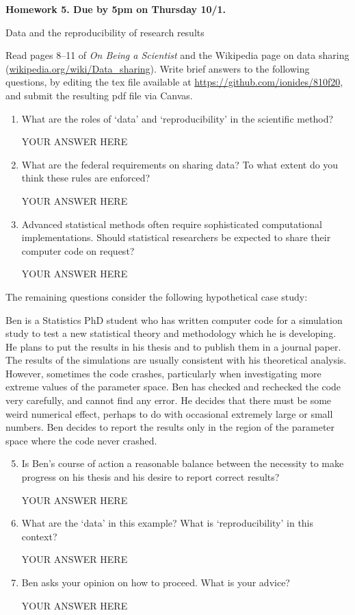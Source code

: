 \documentclass[12pt]{article}
\begin{document}
\begin{center}\bf
Homework 5. Due by 5pm on Thursday 10/1.

Data and the reproducibility of research results
\end{center}
Read pages 8--11 of {\em On Being a Scientist} and the Wikipedia page on data sharing (\url{wikipedia.org/wiki/Data_sharing}). Write brief answers to the following questions, by editing the tex file available at \url{https://github.com/ionides/810f20}, and submit the resulting pdf file via Canvas.

\begin{enumerate}

\item What are the roles of `data' and `reproducibility' in the scientific method? 

YOUR ANSWER HERE

\item What are the federal requirements on sharing data? To what extent do you think these rules are enforced?

YOUR ANSWER HERE

\item Advanced statistical methods often require sophisticated computational implementations. Should statistical researchers be expected to share their computer code on request?

YOUR ANSWER HERE

\end{enumerate}
The remaining questions consider the following hypothetical case study:

Ben is a Statistics PhD student who has written computer code for a simulation study to test a new statistical theory and methodology which he is developing.
He plans to put the results in his thesis and to publish them in a journal paper.
The results of the simulations are usually consistent with his theoretical analysis. 
However, sometimes the code crashes, particularly when investigating more extreme values of the parameter space.
Ben has checked and rechecked the code very carefully, and cannot find any error.
He decides that there must be some weird numerical effect, perhaps to do with occasional extremely large or small numbers.
Ben decides to report the results only in the region of the parameter space where the code never crashed. 
\begin{enumerate}\setcounter{enumi}{4}
\item Is Ben's course of action a reasonable balance between the necessity to make progress on his thesis and his desire to report correct results? 

YOUR ANSWER HERE

\item What are the `data' in this example? What is `reproducibility' in this context?

YOUR ANSWER HERE

\item Ben asks your opinion on how to proceed. What is your advice?

YOUR ANSWER HERE
\end{enumerate}
\end{document}
